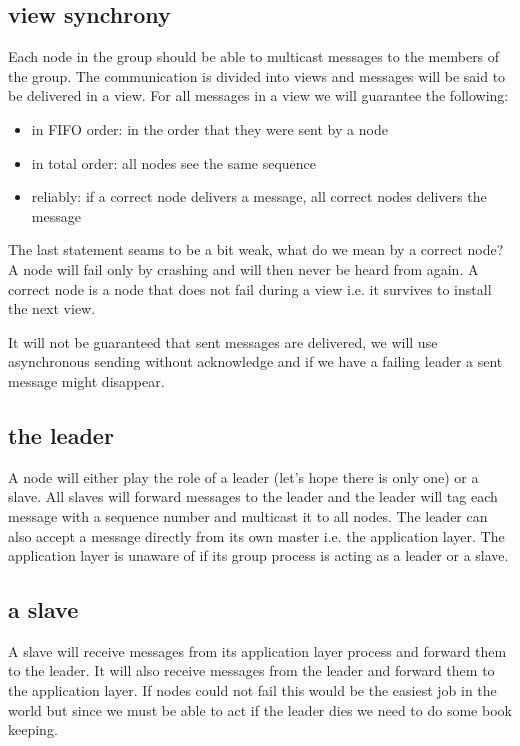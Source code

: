 \documentclass[a4paper,11pt]{article}
\begin{document}
\subsection{view synchrony}

Each node in the group should be able to multicast messages to the
members of the group. The communication is divided into views and
messages will be said to be delivered in a view. For all messages in a
view we will guarantee the following:

\begin{itemize}
\item in FIFO order: in the order that they were sent by a node
\item in total order: all nodes see the same sequence
\item reliably: if a correct node delivers a message, all correct nodes delivers the message
\end{itemize}

The last statement seams to be a bit weak, what do we mean
by a correct node? A node will fail only by crashing and will then
never be heard from again. A correct node is a node that does not fail
during a view i.e. it survives to install the next view.

It will not be guaranteed that sent messages are delivered, we will
use asynchronous sending without acknowledge and if we have a
failing leader a sent message might disappear.

\subsection{the leader}

A node will either play the role of a leader (let's hope there is only
one) or a slave. All slaves will forward messages to the leader and
the leader will tag each message with a sequence number and multicast
it to all nodes. The leader can also accept a message directly from
its own master i.e. the application layer. The application layer is
unaware of if its group process is acting as a leader or a slave.


\subsection{a slave}

A slave will receive messages from its application layer process and
forward them to the leader. It will also receive messages from the
leader and forward them to the application layer. If nodes could not
fail this would be the easiest job in the world but since we must be
able to act if the leader dies we need to do some book keeping.
\end{document}
